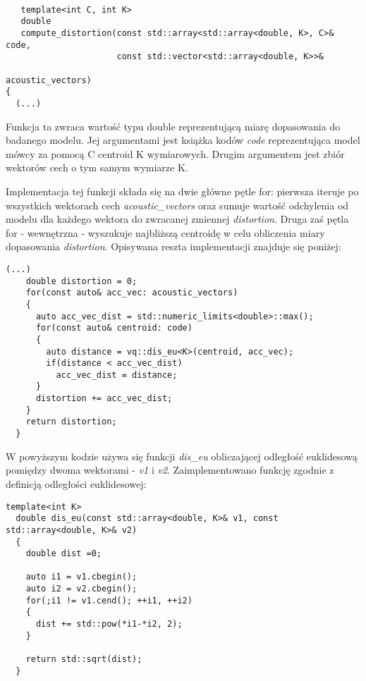 \begin{lstlisting}[style=lst:cpp, caption=Implementacja funkcji \textit{compute\_distortion}\label{lst:distortion}]

   template<int C, int K>
   double
   compute_distortion(const std::array<std::array<double, K>, C>& code,
                      const std::vector<std::array<double, K>>&
                                                       acoustic_vectors)
{
  (...)
\end{lstlisting}
Funkcja ta zwraca wartość typu double reprezentującą miarę dopasowania do badanego modelu. Jej argumentami jest książka kodów \textit{code} reprezentująca model mówcy za pomocą C centroid K wymiarowych. Drugim argumentem jest zbiór wektorów cech o tym samym wymiarze K. 

  Implementacja tej funkcji składa się na dwie główne pętle for: pierwsza iteruje po wszystkich wektorach cech \textit{acoustic\_vectors} oraz sumuje wartość odchylenia od modelu dla każdego wektora do zwracanej zmiennej \textit{distortion}. Druga zaś pętla for - wewnętrzna - wyszukuje najbliższą centroidę w celu obliczenia miary dopasowania \textit{distortion}. Opisywana reszta implementacji znajduje się poniżej: 

\begin{lstlisting}[style=lst:cpp, caption=Ciało funkcji \textit{compute\_distortion}\label{lst:distortionbody}]
    (...)
    double distortion = 0;
    for(const auto& acc_vec: acoustic_vectors)
    {
      auto acc_vec_dist = std::numeric_limits<double>::max();
      for(const auto& centroid: code)
      {
        auto distance = vq::dis_eu<K>(centroid, acc_vec);
        if(distance < acc_vec_dist)
          acc_vec_dist = distance;
      }
      distortion += acc_vec_dist;
    }
    return distortion;    
  }
\end{lstlisting}

W powyższym kodzie używa się funkcji \textit{dis\_eu} obliczającej odległość euklidesową pomiędzy dwoma wektorami - \textit{v1} i \textit{v2}. Zaimplementowano funkcję zgodnie z definicją odległości euklidesowej:

\begin{lstlisting}[style=lst:cpp, caption=Funkcja \textit{dis\_eu}\label{lst:eu}]
  template<int K>
  double dis_eu(const std::array<double, K>& v1, const std::array<double, K>& v2)
  {
    double dist =0;

    auto i1 = v1.cbegin();
    auto i2 = v2.cbegin();
    for(;i1 != v1.cend(); ++i1, ++i2)
    {
      dist += std::pow(*i1-*i2, 2); 
    } 

    return std::sqrt(dist);
  }
\end{lstlisting}

